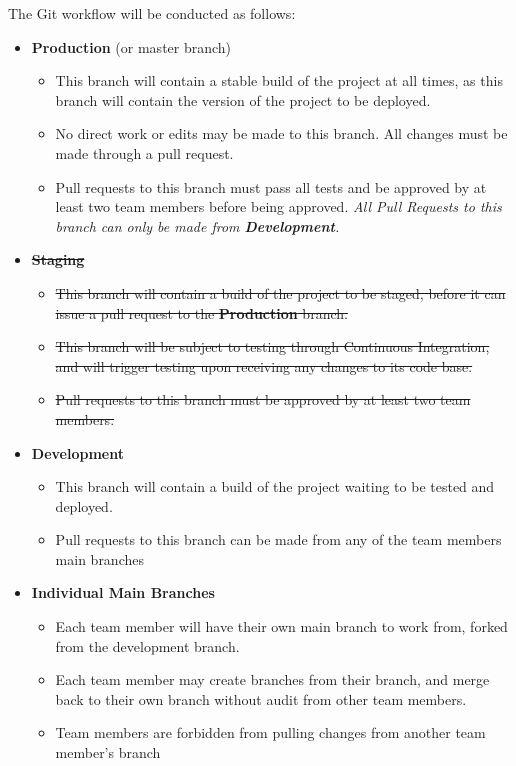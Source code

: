 \documentclass{article}
\begin{document}
The Git workflow will be conducted as follows:
\begin{itemize}
    \item \textbf{Production} (or master branch)
        \begin{itemize}
            \item This branch will contain a stable build of the project at all times, as this branch will contain the version of the project to be deployed.
            \item No direct work or edits may be made to this branch. All changes must be made through a pull request.
            \item Pull requests to this branch must pass all tests and be approved by at least two team members before being approved. \textit{All Pull Requests to this branch can only be made from \textbf{Development}.}
        \end{itemize}
    \item \sout{\textbf{Staging}}
        \begin{itemize}
            \item \sout{This branch will contain a build of the project to be staged, before it can issue a pull request to the \textbf{Production} branch.}
            \item \sout{This branch will be subject to testing through Continuous Integration, and will trigger testing upon receiving any changes to its code base.}
            \item \sout{Pull requests to this branch must be approved by at least two team members.}
        \end{itemize}
    \item \textbf{Development}
        \begin{itemize}
            \item This branch will contain a build of the project waiting to be tested and deployed.
            \item Pull requests to this branch can be made from any of the team members main branches
        \end{itemize}
    \item \textbf{Individual Main Branches}
        \begin{itemize}
            \item Each team member will have their own main branch to work from, forked from the development branch.
            \item Each team member may create branches from their branch, and merge back to their own branch without audit from other team members.
            \item Team members are forbidden from pulling changes from another team member's branch
        \end{itemize}
\end{itemize}
\end{document}
